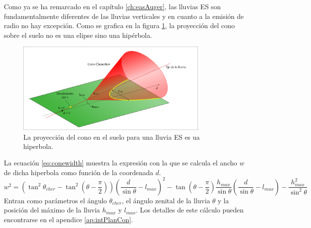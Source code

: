 	Como ya se ha remarcado en el capítulo \ref{ch:easAuger}, las lluvias ES son fundamentalmente diferentes de las lluvias verticales y en cuanto a la emisión de radio no hay excepción. 
	Como se grafica en la figura \ref{fig:chConeES}, la proyección del cono \cher{} sobre el suelo no es una elipse sino una hipérbola.
	\begin{figure}[ht!]
	\centering
		\includegraphics[width=0.85\textwidth]{fig/EASRadio/coneProy}
		\caption{\label{fig:chConeES} La proyección del cono en el suelo para una lluvia ES es ua hiperbola.}
	\end{figure}
	La ecuación \ref{eq:conewidth} muestra la expresión con la que se calcula el ancho $w$ de dicha hiperbola como función de la coordenada $d$.
	\begin{equation}
	w^2=
	(\tan^2 \theta_{cher}-\tan^2 (\theta-\frac{\pi}{2}))
	(\frac{d}{\sin \theta}-l_{max})^2
	- \tan (\theta-\frac{\pi}{2}) \frac{h_{max}}{\sin \theta} (\frac{d}{\sin \theta}-l_{max})
	- \frac{h_{max}^2}{\sin^2 \theta}
	\label{eq:conewidth}
	\end{equation}
	Entran como parámetros el ángulo \cher{} $\theta_{cher}$, el ángulo zenital de la lluvia $\theta$ y la posición del máximo de la lluvia $h_{max}$ y $l_{max}$.
	Los detalles de este cálculo pueden encontrarse en el apendice \ref{ap:intPlanCon}.
	
